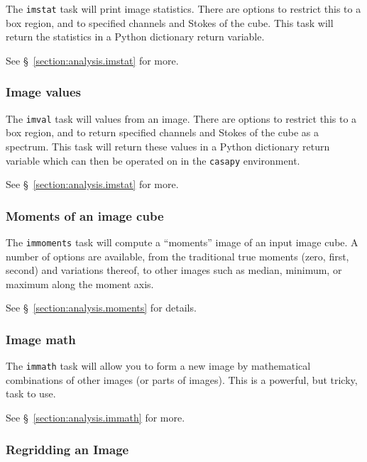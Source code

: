 The {\tt imstat} task will print image statistics.  There are options
to restrict this to a box region, and to specified channels and Stokes
of the cube.  This task will return the statistics in a Python
dictionary return variable.

See \S~\ref{section:analysis.imstat} for more.

\subsubsection{Image values}
\label{section:intro.walkthru.analysis.imval}

The {\tt imval} task will values from an image.  There are options
to restrict this to a box region, and to return specified channels and Stokes
of the cube as a spectrum.  This task will return these values in a Python
dictionary return variable which can then be operated on in the 
{\tt casapy} environment.

See \S~\ref{section:analysis.imstat} for more.

\subsubsection{Moments of an image cube}
\label{section:intro.walkthru.analysis.moments}

The {\tt immoments} task will compute a ``moments'' image of
an input image cube.  A number of options are available, from
the traditional true moments (zero, first, second) and variations
thereof, to other images such as median, minimum, or maximum along
the moment axis.

See \S~\ref{section:analysis.moments} for details.

\subsubsection{Image math}
\label{section:intro.walkthru.analysis.immath}

The {\tt immath} task will allow you to form a new image by
mathematical combinations of other images (or parts of images).
This is a powerful, but tricky, task to use.

See \S~\ref{section:analysis.immath} for more.

\subsubsection{Regridding an Image}
\label{section:intro.walkthru.analysis.regrid}

